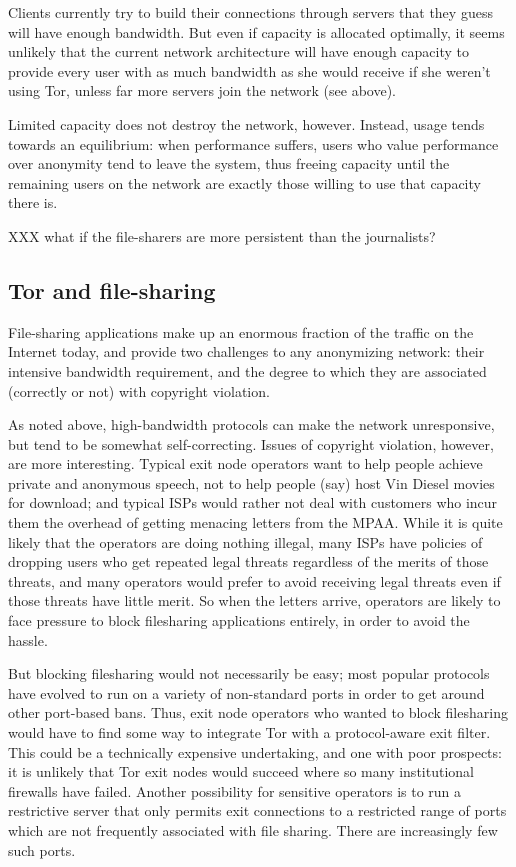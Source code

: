 \documentclass{llncs}
\begin{document}
Clients currently try to build their connections through servers that they
guess will have enough bandwidth.  But even if capacity is allocated
optimally, it seems unlikely that the current network architecture will have
enough capacity to provide every user with as much bandwidth as she would
receive if she weren't using Tor, unless far more servers join the network
(see above).

Limited capacity does not destroy the network, however.  Instead, usage tends
towards an equilibrium: when performance suffers, users who value performance
over anonymity tend to leave the system, thus freeing capacity until the
remaining users on the network are exactly those willing to use that capacity
there is.

XXX what if the file-sharers are more persistent than the journalists?

\subsection{Tor and file-sharing}
File-sharing applications make up an enormous
fraction of the traffic on the Internet today, and provide two challenges to
any anonymizing network: their intensive bandwidth requirement, and the
degree to which they are associated (correctly or not) with copyright
violation.

As noted above, high-bandwidth protocols can make the network unresponsive,
but tend to be somewhat self-correcting.  Issues of copyright violation,
however, are more interesting.  Typical exit node operators want to help
people achieve private and anonymous speech, not to help people (say) host
Vin Diesel movies for download; and typical ISPs would rather not
deal with customers who incur them the overhead of getting menacing letters
from the MPAA.  While it is quite likely that the operators are doing nothing
illegal, many ISPs have policies of dropping users who get repeated legal
threats regardless of the merits of those threats, and many operators would
prefer to avoid receiving legal threats even if those threats have little
merit.  So when the letters arrive, operators are likely to face
pressure to block filesharing applications entirely, in order to avoid the
hassle.

But blocking filesharing would not necessarily be easy; most popular
protocols have evolved to run on a variety of non-standard ports in order to
get around other port-based bans.  Thus, exit node operators who wanted to
block filesharing would have to find some way to integrate Tor with a
protocol-aware exit filter.  This could be a technically expensive
undertaking, and one with poor prospects: it is unlikely that Tor exit nodes
would succeed where so many institutional firewalls have failed.  Another
possibility for sensitive operators is to run a restrictive server that
only permits exit connections to a restricted range of ports which are
not frequently associated with file sharing.  There are increasingly few such
ports.
\end{document}
